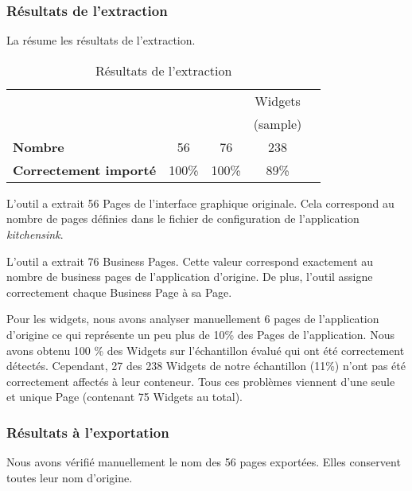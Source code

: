 \documentclass[a4paper]{article}
\begin{document}
\subsubsection{Résultats de l'extraction}
\label{sec:retroImport}

La  résume les résultats de l'extraction.

\begin{table}[htbp]
  \caption{Résultats de l'extraction}
  \vspace{-1.5em}
  \label{tab:resultImport}
  \begin {center}
    \begin{tabular}{lcccc}
        \hline
          & \raisebox{-0.5em}{Pages} & \raisebox{-0.5em}{Business Pages} & Widgets \\
          &  &  & (sample) \\
        \hline
        \textbf{Nombre} & 56 & 76 & 238 \\
        \textbf{Correctement importé} & 100\% & 100\% & 89\% \\
        \hline
    \end{tabular} %
    \end{center}
\end{table}

L'outil a extrait 56 Pages de l'interface graphique originale.
Cela correspond au nombre de pages définies dans le fichier de configuration
  de l'application \textit{kitchensink}.

L'outil a extrait 76 Business Pages.
Cette valeur correspond exactement au nombre de business pages de l'application d'origine.
De plus, l'outil assigne correctement chaque Business Page à sa Page. 

Pour les widgets, nous avons analyser manuellement 6 pages de l'application d'origine
  ce qui représente un peu plus de 10\% des Pages de l'application.
Nous avons obtenu 100 \% des Widgets sur l'échantillon évalué qui ont été correctement détectés.
Cependant, 27 des 238 Widgets de notre échantillon (11\%) n'ont pas été correctement affectés à leur conteneur.
Tous ces problèmes viennent d'une seule et unique Page (contenant 75 Widgets au total).

\subsubsection{Résultats à l'exportation}
\label{sec:export}

Nous avons vérifié manuellement le nom des 56 pages exportées.
Elles conservent toutes leur nom d'origine.
\end{document}
